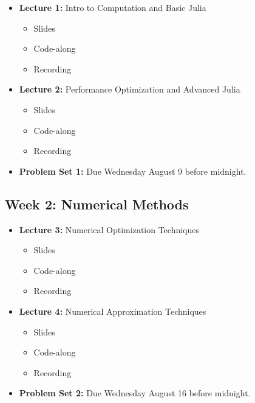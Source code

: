 \documentclass[
]{book}
\providecommand{\tightlist}{%
  \setlength{\itemsep}{0pt}\setlength{\parskip}{0pt}}
\begin{document}
\begin{itemize}
\tightlist
\item
  \textbf{Lecture 1:} Intro to Computation and Basic Julia

  \begin{itemize}
  \tightlist
  \item
    Slides
  \item
    Code-along
  \item
    Recording
  \end{itemize}
\item
  \textbf{Lecture 2:} Performance Optimization and Advanced Julia

  \begin{itemize}
  \tightlist
  \item
    Slides
  \item
    Code-along
  \item
    Recording
  \end{itemize}
\item
  \textbf{Problem Set 1:} Due Wednesday August 9 before midnight.
\end{itemize}

\hypertarget{week-2-numerical-methods}{%
\subsection{Week 2: Numerical Methods}\label{week-2-numerical-methods}}

\begin{itemize}
\tightlist
\item
  \textbf{Lecture 3:} Numerical Optimization Techniques

  \begin{itemize}
  \tightlist
  \item
    Slides
  \item
    Code-along
  \item
    Recording
  \end{itemize}
\item
  \textbf{Lecture 4:} Numerical Approximation Techniques

  \begin{itemize}
  \tightlist
  \item
    Slides
  \item
    Code-along
  \item
    Recording
  \end{itemize}
\item
  \textbf{Problem Set 2:} Due Wednesday August 16 before midnight.
\end{itemize}
\end{document}
